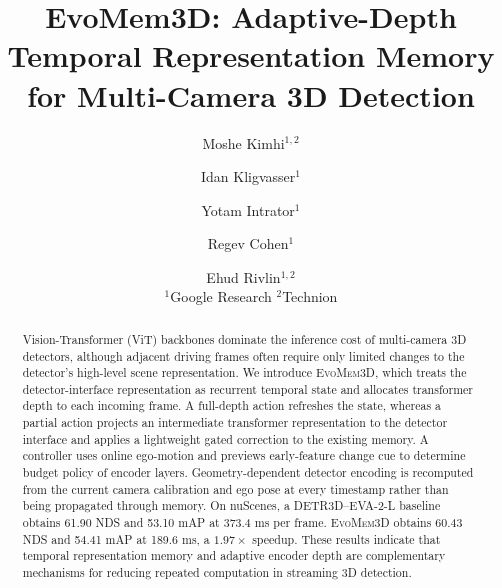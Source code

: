 \documentclass[10pt,twocolumn,letterpaper]{article}
\title{EvoMem3D: Adaptive-Depth Temporal Representation Memory for Multi-Camera 3D Detection}
\author{Moshe Kimhi$^{1,2}$
\and Idan Kligvasser$^{1}$
\and Yotam Intrator$^{1}$
\and Regev Cohen$^{1}$
\and Ehud Rivlin$^{1,2}$
\\
$^{1}$Google Research \quad $^{2}$Technion}
\newcommand{\method}{\textsc{EvoMem3D}}
\begin{document}
\maketitle


\begin{abstract}
Vision-Transformer (ViT) backbones dominate the inference cost of multi-camera 3D detectors, although adjacent driving frames often require only limited changes to the detector's high-level scene representation. We introduce \method{}, which treats the detector-interface representation as recurrent temporal state and allocates transformer depth to each incoming frame. A full-depth action refreshes the state, whereas a partial action projects an intermediate transformer representation to the detector interface and applies a lightweight gated correction to the existing memory. A controller uses online ego-motion and previews early-feature change cue to determine budget policy of encoder layers. Geometry-dependent detector encoding is recomputed from the current camera calibration and ego pose at every timestamp rather than being propagated through memory.
On nuScenes, a DETR3D--EVA-2-L baseline obtains 61.90 NDS and 53.10 mAP at 373.4 ms per frame. \method{} obtains 60.43 NDS and 54.41 mAP at 189.6 ms, a $1.97\times$ speedup. These results indicate that temporal representation memory and adaptive encoder depth are complementary mechanisms for reducing
repeated computation in streaming 3D detection.
\end{abstract}
\end{document}
